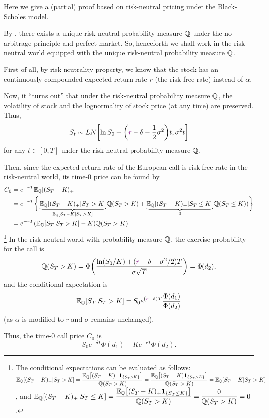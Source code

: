 \begin{enumerate}
\begin{pf}
Here we give a (partial) proof based on risk-neutral pricing under the
Black-Scholes model.

By , there exists a unique risk-neutral
probability measure \(\mathbb{Q}\) under the no-arbitrage principle and perfect market.
So, henceforth we shall work in the risk-neutral world equipped with the unique
risk-neutral probability measure \(\mathbb{Q}\).

First of all, by risk-neutrality property, we know that the stock
 has an continuously compounded expected return rate \(r\)
(the risk-free rate) instead of \(\alpha\).

Now, it ``turns out'' that under the risk-neutral probability measure \(\mathbb{Q}\),
the volatility of stock and the lognormality of stock price (at any time) are
preserved. Thus,
\[
S_t\sim LN\qty[\ln S_0+\qty({\color{violet}r}-\delta-\frac{1}{2}\sigma^2)t,\sigma^2t]
\]
for any \(t\in[0,T]\) under the risk-neutral probability measure \(\mathbb{Q}\).

Then, since the expected return rate of the European call is risk-free rate in
the risk-neutral world, its time-0 price can be found by
\begin{align*}
C_0&=e^{-rT}\mathbb{E}_{\mathbb{Q}}\qty[(S_T-K)_{+}]\\
&=e^{-rT}\bigg\{\underbrace{\mathbb{E}_{\mathbb{Q}}\qty[(S_T-K)_{+}|S_T>K]}_{\mathbb{E}_{\mathbb{Q}}\qty[S_T-K|S_T>K]}\mathbb{Q}\qty(S_T>K)
+\underbrace{\mathbb{E}_{\mathbb{Q}}\qty[(S_T-K)_{+}|S_T\le K]}_{0}\mathbb{Q}\qty(S_T\le K))\bigg\}\\
&=e^{-rT}(\mathbb{E}_{\mathbb{Q}}\qty[S_T|S_T>K]-K)\mathbb{Q}\qty(S_T>K).
\end{align*}
\footnote{The conditional expectations can be evaluated as follows:
\(\displaystyle \mathbb{E}_{\mathbb{Q}}\qty[(S_T-K)_{+}|S_T>K]=\frac{\mathbb{E}_{\mathbb{Q}}\qty[(S_T-K)_{+}\mathbf{1}_{\left\{S_T>K\right\}}]}{\mathbb{Q}\qty(S_T>K)}
=\frac{\mathbb{E}_{\mathbb{Q}}\qty[(S_T-K)\mathbf{1}_{\left\{S_T>K\right\}}]}{\mathbb{Q}\qty(S_T>K)}=\mathbb{E}_{\mathbb{Q}}\qty[S_T-K|S_T>K]
\), and \(\displaystyle \mathbb{E}_{\mathbb{Q}}\qty[(S_T-K)_{+}|S_T\le K]=\frac{\mathbb{E}_{\mathbb{Q}}\qty[(S_T-K)_{+}\mathbf{1}_{\left\{S_T\le K\right\}}]}{\mathbb{Q}\qty(S_T>K)}
=\frac{0}{\mathbb{Q}\qty(S_T>K)}=0\).}
In the risk-neutral world with probability measure \(\mathbb{Q}\), the exercise
probability for the call is
\[
\mathbb{Q}\qty(S_T>K)=\Phi\qty(\frac{\ln(S_0/K)+({\color{violet}r}-\delta-\sigma^2/2)T}{\sigma\sqrt{T}})
=\Phi(d_2),
\]
and the conditional expectation is
\[
\mathbb{E}_{\mathbb{Q}}\qty[S_T|S_T>K]=S_0e^{({\color{violet}r}-\delta)T}\frac{\Phi(d_1)}{\Phi(d_2)}
\]
(as \(\alpha\) is modified to \(r\) and \(\sigma\) remains unchanged).

Thus, the time-0 call price \(C_0\) is
\[
S_0e^{-\delta T}\Phi(d_1)-Ke^{-rT}\Phi(d_2).
\]


\end{pf}
\end{enumerate}
